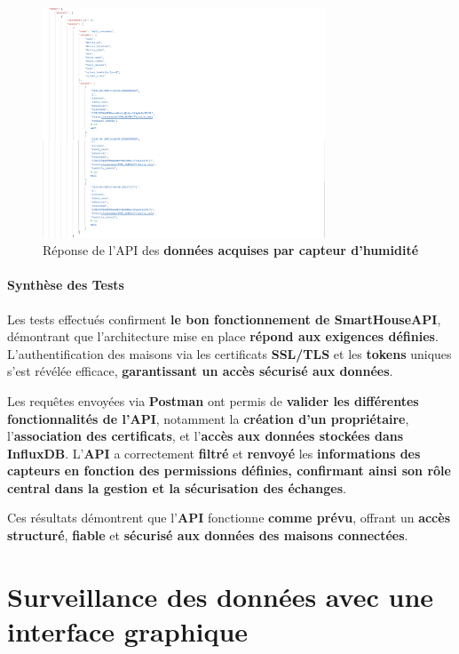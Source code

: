 \documentclass[10pt, a4paper]{report}
\begin{document}
	\begin{figure}[h!]
		\centering
		\includegraphics[width=0.75\textwidth]{ressources/img/preuves/dataBySensorReponse}
		\caption{Réponse de l'API des \textbf{données acquises par capteur d'humidité}}
		\label{fig:dataBySensorResponse}
	\end{figure}
	
	\paragraph{Synthèse des Tests}
	Les tests effectués confirment \textbf{le bon fonctionnement de SmartHouseAPI}, démontrant que l’architecture mise en place\textbf{ répond aux exigences définies}. L’authentification des maisons via les certificats \textbf{SSL/TLS} et les \textbf{tokens} uniques s'est révélée efficace, \textbf{garantissant un accès sécurisé aux données}.
	
	Les requêtes envoyées via \textbf{Postman} ont permis de \textbf{valider les différentes fonctionnalités de l’API}, notamment la \textbf{création d’un propriétaire}, l’\textbf{association des certificats}, et l’\textbf{accès aux données stockées dans InfluxDB}. L'\textbf{API} a correctement \textbf{filtré} et \textbf{renvoyé} les \textbf{informations des capteurs en fonction des permissions définies, confirmant ainsi son rôle central dans la gestion et la sécurisation des échanges}.
	
	Ces résultats démontrent que l’\textbf{API} fonctionne \textbf{comme prévu}, offrant un \textbf{accès structuré}, \textbf{fiable} et\textbf{ sécurisé aux données des maisons connectées}.
	
	\section{Surveillance des données avec une interface graphique}
\end{document}
